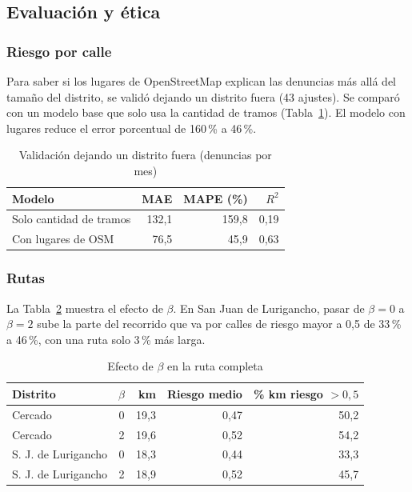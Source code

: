 \subsection{Evaluación y ética}

\subsubsection{Riesgo por calle}
Para saber si los lugares de OpenStreetMap explican las denuncias más allá del tamaño del distrito, se validó dejando un distrito fuera (43 ajustes). Se comparó con un modelo base que solo usa la cantidad de tramos (Tabla~\ref{tab:loo}). El modelo con lugares reduce el error porcentual de 160\,\% a 46\,\%.

\begin{table}[htbp]
\caption{Validación dejando un distrito fuera (denuncias por mes)}
\label{tab:loo}
\centering
\begin{tabular}{lrrr}
\toprule
Modelo & MAE & MAPE (\%) & $R^2$ \\
\midrule
Solo cantidad de tramos & 132,1 & 159,8 & 0,19 \\
Con lugares de OSM & 76,5 & 45,9 & 0,63 \\
\bottomrule
\end{tabular}
\end{table}

\subsubsection{Rutas}
La Tabla~\ref{tab:beta} muestra el efecto de $\beta$. En San Juan de Lurigancho, pasar de $\beta=0$ a $\beta=2$ sube la parte del recorrido que va por calles de riesgo mayor a 0,5 de 33\,\% a 46\,\%, con una ruta solo 3\,\% más larga.

\begin{table}[htbp]
\caption{Efecto de $\beta$ en la ruta completa}
\label{tab:beta}
\centering
\begin{tabular}{lcrrr}
\toprule
Distrito & $\beta$ & km & Riesgo medio & \% km riesgo $>0{,}5$ \\
\midrule
Cercado & 0 & 19,3 & 0,47 & 50,2 \\
Cercado & 2 & 19,6 & 0,52 & 54,2 \\
S. J. de Lurigancho & 0 & 18,3 & 0,44 & 33,3 \\
S. J. de Lurigancho & 2 & 18,9 & 0,52 & 45,7 \\
\bottomrule
\end{tabular}
\end{table}

